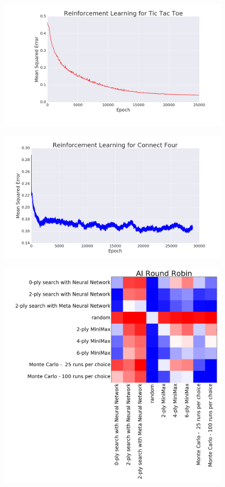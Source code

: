 \begin{frame}
\begin{figure}
\includegraphics[width=1 \textwidth]{reinforcement_ttt}
\end{figure}
\end{frame}

\begin{frame}
\begin{figure}
\includegraphics[width=1 \textwidth]{reinforcement_c4}
\end{figure}
\end{frame}

\begin{frame}
\begin{figure}
\includegraphics[width=0.70 \textwidth]{round_robin}
\end{figure}
\end{frame}

